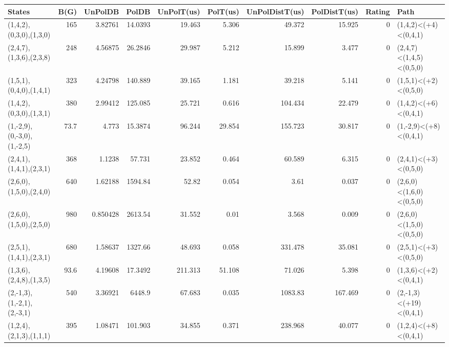 \begin{tabular}{lrrrrrrrrl}
\hline
 States                     &   B(G) &   UnPolDB &       PolDB &   UnPolT(us) &   PolT(us) &   UnPolDistT(us) &   PolDistT(us) &   Rating & Path                    \\
\hline
 (1,4,2),(0,3,0),(1,3,0)    &  165   &  3.82761  &   14.0393   &       19.463 &      5.306 &           49.372 &         15.925 &        0 & (1,4,2)<(+4)<(0,4,1)    \\
 (2,4,7),(1,3,6),(2,3,8)    &  248   &  4.56875  &   26.2846   &       29.987 &      5.212 &           15.899 &          3.477 &        0 & (2,4,7)<(1,4,5)<(0,5,0) \\
 (1,5,1),(0,4,0),(1,4,1)    &  323   &  4.24798  &  140.889    &       39.165 &      1.181 &           39.218 &          5.141 &        0 & (1,5,1)<(+2)<(0,5,0)    \\
 (1,4,2),(0,3,0),(1,3,1)    &  380   &  2.99412  &  125.085    &       25.721 &      0.616 &          104.434 &         22.479 &        0 & (1,4,2)<(+6)<(0,4,1)    \\
 (1,-2,9),(0,-3,0),(1,-2,5) &   73.7 &  4.773    &   15.3874   &       96.244 &     29.854 &          155.723 &         30.817 &        0 & (1,-2,9)<(+8)<(0,4,1)   \\
 (2,4,1),(1,4,1),(2,3,1)    &  368   &  1.1238   &   57.731    &       23.852 &      0.464 &           60.589 &          6.315 &        0 & (2,4,1)<(+3)<(0,5,0)    \\
 (2,6,0),(1,5,0),(2,4,0)    &  640   &  1.62188  & 1594.84     &       52.82  &      0.054 &            3.61  &          0.037 &        0 & (2,6,0)<(1,6,0)<(0,5,0) \\
 (2,6,0),(1,5,0),(2,5,0)    &  980   &  0.850428 & 2613.54     &       31.552 &      0.01  &            3.568 &          0.009 &        0 & (2,6,0)<(1,5,0)<(0,5,0) \\
 (2,5,1),(1,4,1),(2,3,1)    &  680   &  1.58637  & 1327.66     &       48.693 &      0.058 &          331.478 &         35.081 &        0 & (2,5,1)<(+3)<(0,5,0)    \\
 (1,3,6),(2,4,8),(1,3,5)    &   93.6 &  4.19608  &   17.3492   &      211.313 &     51.108 &           71.026 &          5.398 &        0 & (1,3,6)<(+2)<(0,4,1)    \\
 (2,-1,3),(1,-2,1),(2,-3,1) &  540   &  3.36921  & 6448.9      &       67.683 &      0.035 &         1083.83  &        167.469 &        0 & (2,-1,3)<(+19)<(0,4,1)  \\
 (1,2,4),(2,1,3),(1,1,1)    &  395   &  1.08471  &  101.903    &       34.855 &      0.371 &          238.968 &         40.077 &        0 & (1,2,4)<(+8)<(0,4,1)    \\

\end{tabular}

